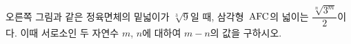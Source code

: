 \noindent\begin{minipage}[t]{0.58\linewidth}\vspace{0pt}\raggedright 오른쪽 그림과 같은 정육면체의 밑넓이가 $\sqrt[3]{9}$일 때, 삼각형~$\mathrm{AFC}$의 넓이는 $\dfrac{\sqrt[n]{3^m}}{2}$이다. 이때 서로소인 두 자연수 $m$, $n$에 대하여 $m-n$의 값을 구하시오. \end{minipage}\hfill\begin{minipage}[t]{0.4\linewidth}\vspace{0pt}\centering \resizebox{\ifdim\width>\linewidth\linewidth\else\width\fi}{!}{}\end{minipage}\par
